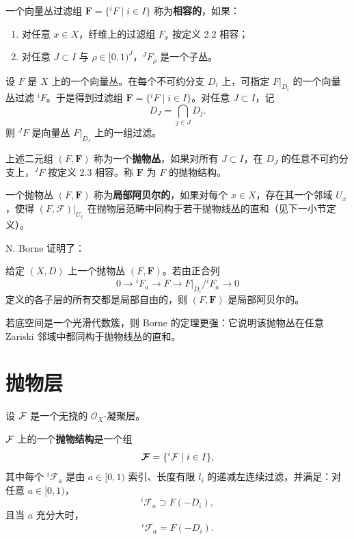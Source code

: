 \begin{definition}
一个向量丛过滤组 \(\boldsymbol{F}=\{{}^iF\mid i\in I\}\) 称为\textbf{相容的}，如果：
\begin{enumerate}[label=\arabic*.]
\item 对任意 \(x\in X\)，纤维上的过滤组 \(F_x\) 按定义 2.2 相容；
\item 对任意 \(J\subset I\) 与 \(\rho\in[0,1)^J\)，\({}^J F_\rho\) 是一个子丛。
\end{enumerate}
\end{definition}

设 \(F\) 是 \(X\) 上的一个向量丛。在每个不可约分支 \(D_i\) 上，可指定 \(F|_{D_i}\) 的一个向量丛过滤 \({}^iF\)。于是得到过滤组 \(\boldsymbol{F}=\{{}^iF\mid i\in I\}\)。对任意 \(J\subset I\)，记
\[
D_J=\bigcap_{j\in J}D_j.
\]
则 \({}^JF\) 是向量丛 \(F|_{D_J}\) 上的一组过滤。

\begin{definition}
上述二元组 \((F,\boldsymbol{F})\) 称为一个\textbf{抛物丛}，如果对所有 \(J\subset I\)，在 \(D_J\) 的任意不可约分支上，\({}^J F\) 按定义 2.3 相容。称 \(\boldsymbol{F}\) 为 \(F\) 的抛物结构。
\end{definition}

\begin{definition}
一个抛物丛 \((F,\boldsymbol{F})\) 称为\textbf{局部阿贝尔的}，如果对每个 \(x\in X\)，存在其一个邻域 \(U_x\)，使得 \((F,\mathcal F)|_{U_x}\) 在抛物层范畴中同构于若干抛物线丛的直和（见下一小节定义）。
\end{definition}

N. Borne \cite{Bo} 证明了：

\begin{theorem}
给定 \((X,D)\) 上一个抛物丛 \((F,\boldsymbol{F})\)。若由正合列
\[
0\to {}^iF_a\to F\to F|_{D_i}/{}^iF_a\to 0
\]
定义的各子层的所有交都是局部自由的，则 \((F,\boldsymbol{F})\) 是局部阿贝尔的。
\end{theorem}

\begin{remark}
若底空间是一个光滑代数簇，则 Borne 的定理更强：它说明该抛物丛在任意 Zariski 邻域中都同构于抛物线丛的直和。
\end{remark}

\section{抛物层}

设 \(\mathcal{F}\) 是一个无挠的 \( \mathcal O_X\)-凝聚层。

\begin{definition}
\(\mathcal{F}\) 上的一个\textbf{抛物结构}是一个组
\[
\boldsymbol{\mathcal{F}}=\{{}^i\mathcal F\mid i\in I\},
\]
其中每个 \({}^i\mathcal F_a\) 是由 \(a\in[0,1)\) 索引、长度有限 \(l_i\) 的递减左连续过滤，并满足：对任意 \(a\in[0,1)\)，
\[
{}^i\mathcal F_a\supset F(-D_i),
\]
且当 \(a\) 充分大时，
\[
{}^i\mathcal F_a=F(-D_i).
\]
\end{definition}

